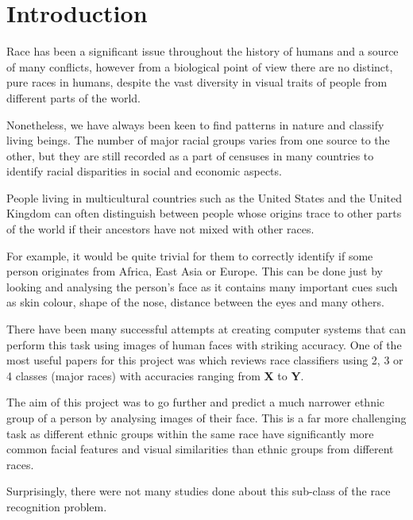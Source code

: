 \chapter{Introduction}
\label{introduction}

Race has been a significant issue throughout the history of humans 
and a source of many conflicts, however from a biological point of view
there are no distinct, pure races in humans, despite the vast diversity 
in visual traits of people from different parts of the world.

Nonetheless, we have always been keen to find patterns in nature and 
classify living beings. The number of major racial groups varies from 
one source to the other, but they are still recorded as a part of censuses 
in many countries to identify racial disparities in social and economic aspects.

People living in multicultural countries such as the United States and the 
United Kingdom can often distinguish between people whose origins trace to other
parts of the world if their ancestors have not mixed with other races.

For example, it would be quite trivial for them to correctly identify if some person
originates from Africa, East Asia or Europe. This can be done just by looking and
analysing the person's face as it contains many important cues such as skin colour, 
shape of the nose, distance between the eyes and many others.

There have been many successful attempts at creating computer systems that can perform
this task using images of human faces with striking accuracy. One of the 
most useful papers for this project was \citep{muhammadg} which reviews 
race classifiers using 2, 3 or 4 classes (major races) with accuracies 
ranging from \textbf{X} to \textbf{Y}.

The aim of this project was to go further and predict a much narrower ethnic group 
of a person by analysing images of their face. This is a far more challenging task 
as different ethnic groups within the same race have significantly more common 
facial features and visual similarities than ethnic groups from different races.

Surprisingly, there were not many studies done about this sub-class of the race 
recognition problem.


